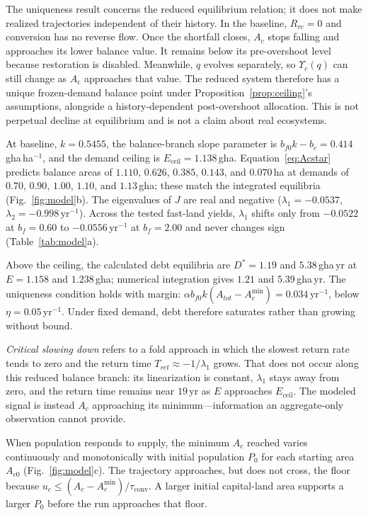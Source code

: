 \documentclass[preprint,12pt,authoryear]{elsarticle}
\newcommand{\Ups}{\Upsilon_c}
\newcommand{\Eceil}{E_{\mathrm{ceil}}}
\newcommand{\Acmin}{A_c^{\min}}
\newcommand{\tconv}{\tau_{\mathrm{conv}}}
\begin{document}
The uniqueness result concerns the reduced equilibrium relation; it does not make realized trajectories independent of their history. In the baseline, $R_{rc}=0$ and conversion has no reverse flow. Once the shortfall closes, $A_c$ stops falling and approaches its lower balance value. It remains below its pre-overshoot level because restoration is disabled. Meanwhile, $q$ evolves separately, so $\Ups(q)$ can still change as $A_c$ approaches that value. The reduced system therefore has a unique frozen-demand balance point under Proposition~\ref{prop:ceiling}'s assumptions, alongside a history-dependent post-overshoot allocation. This is not perpetual decline at equilibrium and is not a claim about real ecosystems.

At baseline, $k=0.5455$, the balance-branch slope parameter is $b_{f0}k-b_c=0.414$\,gha\,ha$^{-1}$, and the demand ceiling is $\Eceil=1.138$\,gha. Equation~\eqref{eq:Acstar} predicts balance areas of $1.110$, $0.626$, $0.385$, $0.143$, and $0.070$\,ha at demands of $0.70$, $0.90$, $1.00$, $1.10$, and $1.13$\,gha; these match the integrated equilibria (Fig.~\ref{fig:model}b). The eigenvalues of $J$ are real and negative ($\lambda_1=-0.0537$, $\lambda_2=-0.998$\,yr$^{-1}$). Across the tested fast-land yields, $\lambda_1$ shifts only from $-0.0522$ at $b_f=0.60$ to $-0.0556$\,yr$^{-1}$ at $b_f=2.00$ and never changes sign (Table~\ref{tab:model}a).

Above the ceiling, the calculated debt equilibria are $D^*=1.19$ and $5.38$\,gha\,yr at $E=1.158$ and $1.238$\,gha; numerical integration gives $1.21$ and $5.39$\,gha\,yr. The uniqueness condition holds with margin: $\alpha b_{f0}k(A_{tot}-\Acmin)=0.034$\,yr$^{-1}$, below $\eta=0.05$\,yr$^{-1}$. Under fixed demand, debt therefore saturates rather than growing without bound.

\emph{Critical slowing down} refers to a fold approach in which the slowest return rate tends to zero and the return time $T_{ret}\approx-1/\lambda_1$ grows. That does not occur along this reduced balance branch: its linearization is constant, $\lambda_1$ stays away from zero, and the return time remains near $19$\,yr as $E$ approaches $\Eceil$. The modeled signal is instead $A_c$ approaching its minimum—information an aggregate-only observation cannot provide.

When population responds to supply, the minimum $A_c$ reached varies continuously and monotonically with initial population $P_0$ for each starting area $A_{c0}$ (Fig.~\ref{fig:model}c). The trajectory approaches, but does not cross, the floor because $u_c\le(A_c-\Acmin)/\tconv$. A larger initial capital-land area supports a larger $P_0$ before the run approaches that floor.
\end{document}
